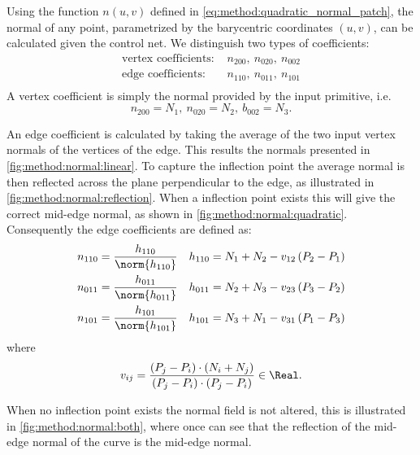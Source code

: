 	Using the function $n(u,v)$ defined in \eqref{eq:method:quadratic_normal_patch}, the normal of any point, parametrized by the barycentric coordinates $(u,v)$, can be calculated given the control net. We distinguish two types of coefficients:
	\begin{align*}
		\text{vertex coefficients: } {}&  n_{200},\ n_{020},\ n_{002} \\
		\text{edge coefficients: } {}&  n_{110},\ n_{011},\ n_{101}\\
	\end{align*}
	A vertex coefficient is simply the normal provided by the input primitive, i.e.
	\begin{equation}
		n_{200} = N_1,\ n_{020} = N_2,\ b_{002} = N_3.
	\end{equation}

	An edge coefficient is calculated by taking the average of the two input vertex normals of the vertices of the edge. This results the normals presented in \cref{fig:method:normal:linear}. To capture the inflection point the average normal is then reflected across the plane perpendicular to the edge, as illustrated in \cref{fig:method:normal:reflection}. When a inflection point exists this will give the correct mid-edge normal, as shown in \cref{fig:method:normal:quadratic}. Consequently the edge coefficients are defined as:
	\begin{equation}\label{eq:method:edge_coefficients}
		\begin{aligned}
			n_{110} = {}& \frac{h_{110}}{\norm{h_{110}}} & h_{110} = N_1 + N_2 - v_{12}\left(P_2 - P_1\right)\\
			n_{011} = {}& \frac{h_{011}}{\norm{h_{011}}} & h_{011} = N_2 + N_3 - v_{23}\left(P_3 - P_2\right)\\
			n_{101} = {}& \frac{h_{101}}{\norm{h_{101}}} & h_{101} = N_3 + N_1 - v_{31}\left(P_1 - P_3\right)\\			
		\end{aligned}		
	\end{equation}
	where
	\begin{equation*}
		v_{ij} = \frac{\left(P_j - P_i \right) \cdot \left(N_i + N_j \right)}{\left(P_j - P_i \right) \cdot \left(P_j - P_i \right)} \in \Real.
	\end{equation*}

	 When no inflection point exists the normal field is not altered, this is illustrated in \cref{fig:method:normal:both}, where once can see that the reflection of the mid-edge normal of the curve is the mid-edge normal.

